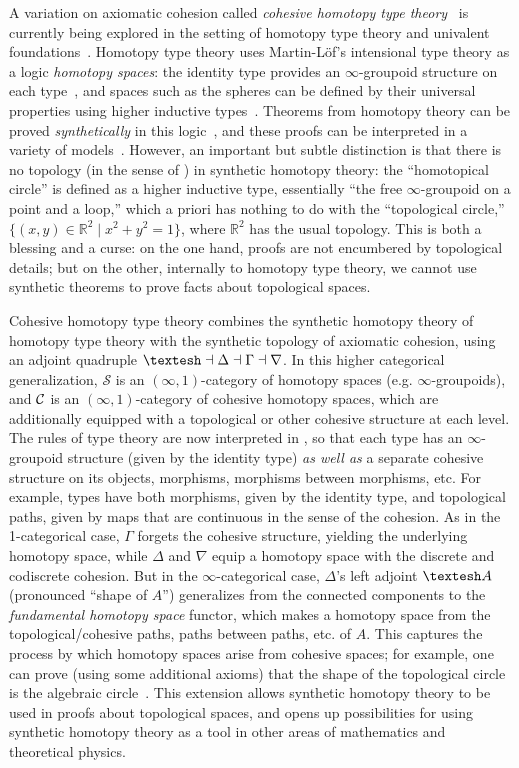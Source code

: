 \documentclass{drl-common/llncs}
\begin{document}
A variation on axiomatic cohesion called \emph{cohesive homotopy type
  theory}~\citep{schreibershulman12cohesive,shulman15realcohesion} is
currently being explored in the setting of homotopy type theory and
univalent foundations~\citep{voevodsky06note,uf13hott-book}.  Homotopy
type theory uses Martin-L\"of's intensional type theory as a logic
\emph{homotopy spaces}: the identity type provides an $\infty$-groupoid
structure on each type~\citep{...}, and spaces such as the spheres can
be defined by their universal properties using higher inductive
types~\citep{...}.  Theorems from homotopy theory can be proved
\emph{synthetically} in this logic~\citep{ls13pi1s1,lb13pinsn,...}, and
these proofs can be interpreted in a variety of models~\citep{...}.
However, an important but subtle distinction is that there is no
topology (in the sense of \citep{scott,etc}) in synthetic homotopy
theory: the ``homotopical circle'' is defined as a higher inductive
type, essentially ``the free $\infty$-groupoid on a point and a loop,''
which a priori has nothing to do with the ``topological circle,'' $\{
(x,y) \in \mathbb{R}^2 \mid x^2 + y^2 = 1\}$, where $\mathbb{R}^2$ has
the usual topology.  This is both a blessing and a curse: on the one
hand, proofs are not encumbered by topological details; but on the
other, internally to homotopy type theory, we cannot use synthetic
theorems to prove facts about topological spaces.

Cohesive homotopy type theory combines the synthetic homotopy theory of
homotopy type theory with the synthetic topology of axiomatic cohesion,
using an adjoint quadruple $\sh \la \Delta \la \Gamma \la \nabla$.  In
this higher categorical generalization, $\mathcal{S}$ is an
$(\infty,1)$-category of homotopy spaces (e.g. $\infty$-groupoids), and
$\mathcal{C}$ is an $(\infty,1)$-category of cohesive homotopy spaces, which are
additionally equipped with a topological or other cohesive structure at
each level.  The rules of type theory are now interpreted in \C, so that
each type has an $\infty$-groupoid structure (given by the identity
type) \emph{as well as} a separate cohesive structure on its objects,
morphisms, morphisms between morphisms, etc.  For example, types have
both morphisms, given by the identity type, and topological paths, given
by maps that are continuous in the sense of the cohesion.  As in the
1-categorical case, $\Gamma$ forgets the cohesive structure, yielding
the underlying homotopy space, while $\Delta$ and $\nabla$ equip a
homotopy space with the discrete and codiscrete cohesion.  But in the
$\infty$-categorical case, $\Delta$'s left adjoint $\sh A$ (pronounced
``shape of $A$'') generalizes from the connected components to the
\emph{fundamental homotopy space} functor, which makes a homotopy space
from the topological/cohesive paths, paths between paths, etc. of $A$.
This captures the process by which homotopy spaces arise from cohesive
spaces; for example, one can prove (using some additional axioms) that
the shape of the topological circle is the algebraic
circle~\citep{shulman15realcohesion}.  This extension allows synthetic
homotopy theory to be used in proofs about topological spaces, and opens
up possibilities for using synthetic homotopy theory as a tool in other
areas of mathematics and theoretical physics.
\end{document}
